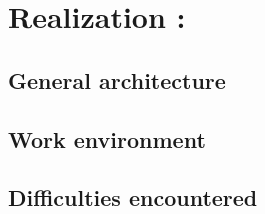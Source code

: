 \chapter{Realization :}
\setcounter{secnumdepth}{3}
\newpage

\section{General architecture}

\section{Work environment}

\section{Difficulties encountered}